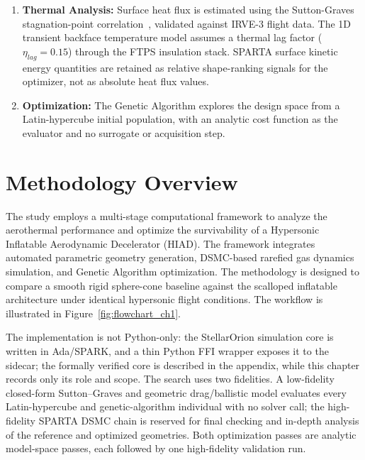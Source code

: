 \begin{enumerate}
    \item \textbf{Thermal Analysis:} Surface heat flux is estimated using the Sutton-Graves stagnation-point correlation~\cite{sutton1971gravesh}, validated against IRVE-3 flight data. The 1D transient backface temperature model assumes a thermal lag factor ($\eta_{lag} = 0.15$) through the FTPS insulation stack. SPARTA surface kinetic energy quantities are retained as relative shape-ranking signals for the optimizer, not as absolute heat flux values.

    \item \textbf{Optimization:} The Genetic Algorithm explores the design space from a Latin-hypercube initial population, with an analytic cost function as the evaluator and no surrogate or acquisition step.
\end{enumerate}

\section{Methodology Overview}
The study employs a multi-stage computational framework to analyze the aerothermal performance and optimize the survivability of a Hypersonic Inflatable Aerodynamic Decelerator (HIAD). The framework integrates automated parametric geometry generation, DSMC-based rarefied gas dynamics simulation, and Genetic Algorithm optimization. The methodology is designed to compare a smooth rigid sphere-cone baseline against the scalloped inflatable architecture under identical hypersonic flight conditions. The workflow is illustrated in Figure~\ref{fig:flowchart_ch1}.

The implementation is not Python-only: the StellarOrion simulation core is written in Ada/SPARK, and a thin Python FFI wrapper exposes it to the sidecar; the formally verified core is described in the appendix, while this chapter records only its role and scope. The search uses two fidelities. A low-fidelity closed-form Sutton--Graves and geometric drag/ballistic model evaluates every Latin-hypercube and genetic-algorithm individual with no solver call; the high-fidelity SPARTA DSMC chain is reserved for final checking and in-depth analysis of the reference and optimized geometries. Both optimization passes are analytic model-space passes, each followed by one high-fidelity validation run.

